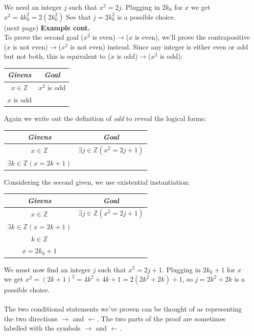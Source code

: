 \documentclass{report}
\theoremstyle{definition}
\begin{document}
We need an integer $j$ such that $x^2=2j$. Plugging in $2k_0$ for $x$ we get $x^2=4k^2_0=2(2k^2_0)$
See that $j=2k_0^2$ is a possible choice.\\
(next page)\newpage
\noindent\textbf{Example cont.}\\
To prove the second goal ($x^2$ is even)$\to$($x$ is even), we'll prove the contrapositive ($x$ is not even)$\to$($x^2$ is not even) instead. Since any integer
is either even or odd but not both, this is equivalent to ($x$ is odd)$\to$($x^2$ is odd):
\begin{center}
\begin{tabular}{c|c}
\textit{Givens}&\textit{Goal}\\
\hline
$x\in\mathbb Z$&$x^2$ is odd\\
$x$ is odd&\\
\end{tabular}
\end{center}
Again we write out the definition of \textit{odd} to reveal the logical forms:
\begin{center}
\begin{tabular}{c|c}
\textit{Givens}&\textit{Goal}\\
\hline
$x\in\mathbb Z$&$\exists j\in\mathbb Z(x^2=2j+1)$\\
$\exists k\in\mathbb Z(x=2k+1)$\\
\end{tabular}
\end{center}
Considering the second given, we use existential instantiation:
\begin{center}
\begin{tabular}{c|c}
\textit{Givens}&\textit{Goal}\\
\hline
$x\in\mathbb Z$&$\exists j\in\mathbb Z(x^2=2j+1)$\\
$\exists k\in\mathbb Z(x=2k+1)$&\\
$k\in\mathbb Z$&\\
$x=2k_0+1$&
\end{tabular}
\end{center}
We must now find an integer $j$ such that $x^2=2j+1$. Plugging in $2k_0+1$ for $x$ we get 
$x^2=(2k+1)^2=4k^2+4k+1=2(2k^2+2k)+1$, so $j=2k^2+2k$ is a possible choice.\\
\vspace{1mm}\\
The two conditional statements we've proven can be thought of as representing the two directions $\to$ and $\leftarrow$. The two parts of the proof are sometimes labelled with the symbols
$\to$ and $\leftarrow$.\\
\end{document}
